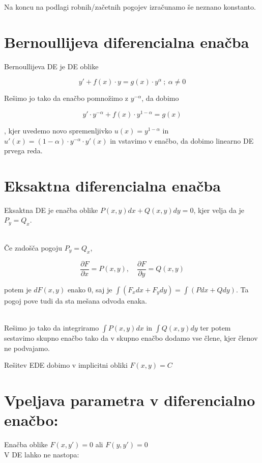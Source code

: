 \documentclass[12pt]{report}
\begin{document}
Na koncu na podlagi robnih/začetnih pogojev izračunamo še neznano konstanto.

 


\section*{Bernoullijeva diferencialna enačba}

Bernoullijeva DE je DE oblike

\[
y'+f(x)\cdot y= g(x)\cdot y^\alpha\ ;\  \alpha \neq 0
\]

Rešimo jo tako da enačbo pomnožimo z $y^{-\alpha}$, da dobimo

\[
y'\cdot y^{-\alpha} + f(x) \cdot y^{1-\alpha}= g(x) 
\] 

, kjer uvedemo novo spremenljivko $u(x) =y^{1-\alpha} $ in $u'(x) = (1-\alpha)\cdot y^{-\alpha} \cdot y'(x)$ in vstavimo v enačbo, da dobimo linearno DE prvega reda.


\section*{Eksaktna diferencialna enačba}
Eksaktna DE je enačba oblike $P(x,y)dx+Q(x,y)dy = 0$, kjer velja da je $P_y=Q_x$.\\\


Če zadošča pogoju $P_y=Q_x$,

\[\frac{\partial F}{\partial x} = P(x, y), \quad \frac{\partial F}{\partial y} = Q(x,y)\]

 potem je $dF(x,y)$ enako 0, saj je $\int (F_xdx+F_ydy)=\int (Pdx + Qdy)$. Ta pogoj pove tudi da sta mešana odvoda enaka.\\\


Rešimo jo tako da integriramo $\int P(x,y) dx$  in $\int Q(x,y) dy$ ter potem sestavimo skupno enačbo tako da v skupno enačbo dodamo vse člene, kjer členov ne podvajamo.

Rešitev EDE dobimo v implicitni obliki
$F(x,y) = C$\\



\section*{Vpeljava parametra v diferencialno enačbo:}
Enačba oblike 
$F(x,y')=0$ ali $F(y,y')=0$\\
V DE lahko ne nastopa:\\\
\end{document}
